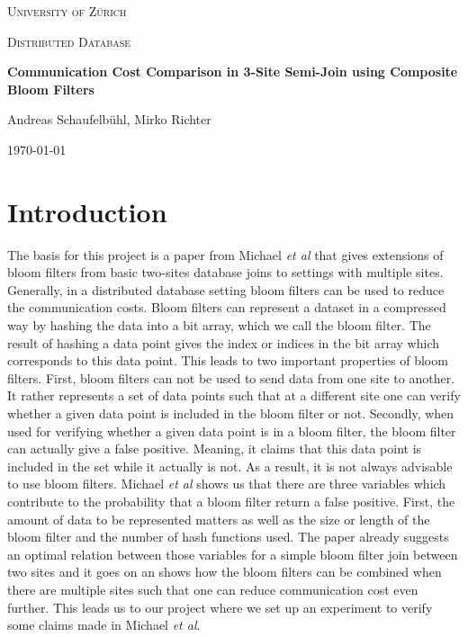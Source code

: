 \documentclass[12]{scrartcl}
\begin{document}
\begin{titlepage}
	\centering
	{\scshape\LARGE University of Zürich\par}
	\vspace{1cm}
	{\scshape\Large Distributed Database\par}
	\vspace{1.5cm}
	{\huge\bfseries Communication Cost Comparison in 3-Site Semi-Join using Composite Bloom Filters\par}
	\vspace{2cm}
	{\Large Andreas Schaufelbühl, Mirko Richter\par}
	\vfill
	
	{\large \today\par}
\end{titlepage}

\tableofcontents
\listoffigures
\listoftables
	
\section{Introduction}
The basis for this project is a paper from Michael {\em et al}\cite{michael} that gives extensions of bloom filters from basic two-sites database joins to settings with multiple sites. Generally, in a distributed database setting bloom filters can be used to reduce the communication costs. Bloom filters can represent a dataset in a compressed way by hashing the data into a bit array, which we call the bloom filter. The result of hashing a data point gives the index or indices in the bit array which corresponds to this data point. This leads to two important properties of bloom filters. First, bloom filters can not be used to send data from one site to another. It rather represents a set of data points such that at a different site one can verify whether a given data point is included in the bloom filter or not. Secondly, when used for verifying whether a given data point is in a bloom filter, the bloom filter can actually give a false positive. Meaning, it claims that this data point is included in the set while it actually is not. As a result, it is not always advisable to use bloom filters. Michael {\em et al}\cite{michael} shows us that there are three variables which contribute to the probability that a bloom filter return a false positive. First, the amount of data to be represented matters as well as the size or length of the bloom filter and the number of hash functions used. The paper already suggests an optimal relation between those variables for a simple bloom filter join between two sites and it goes on an shows how the bloom filters can be combined when there are multiple sites such that one can reduce communication cost even further. This leads us to our project where we set up an experiment to verify some claims made in Michael {\em et al}\cite{michael}.
\end{document}
